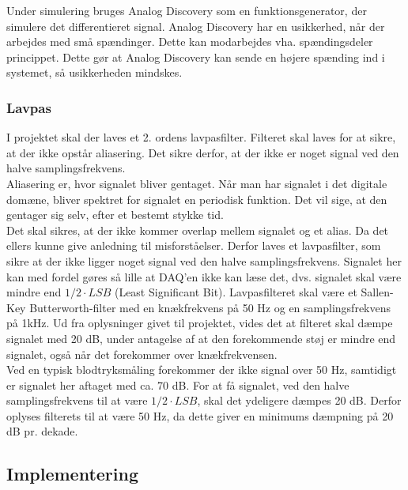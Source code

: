 Under simulering bruges Analog Discovery som en funktionsgenerator, der simulere det differentieret signal. Analog Discovery har en usikkerhed, når der arbejdes med små spændinger. Dette kan modarbejdes vha. spændingsdeler princippet. Dette gør at Analog Discovery kan sende en højere spænding ind i systemet, så usikkerheden mindskes.  

\subsubsection{Lavpas}
I projektet skal der laves et 2. ordens lavpasfilter. Filteret skal laves for at sikre, at der ikke opstår aliasering. Det sikre derfor, at der ikke er noget signal ved den halve samplingsfrekvens.\\
Aliasering \cite{DSB} er, hvor signalet bliver gentaget. Når man har signalet i det digitale domæne, bliver spektret for signalet en periodisk funktion. Det vil sige, at den gentager sig selv, efter et bestemt stykke tid. \\
Det skal sikres, at der ikke kommer overlap mellem signalet og et alias. Da det ellers kunne give anledning til misforståelser. Derfor laves et lavpasfilter, som sikre at der ikke ligger noget signal ved den halve samplingsfrekvens. Signalet her kan med fordel gøres så lille at DAQ'en ikke kan læse det, dvs. signalet skal være mindre end $ 1/2 \cdot LSB $ (Least Significant Bit).    
\newline  
Lavpasfilteret skal være et Sallen-Key Butterworth-filter med en knækfrekvens på 50 Hz og en samplingsfrekvens på 1kHz. Ud fra oplysninger givet til projektet, vides det at filteret skal dæmpe signalet med 20 dB, under antagelse af at den forekommende støj er mindre end signalet, også når det  forekommer over knækfrekvensen.\\
Ved en typisk blodtryksmåling forekommer der ikke signal over 50 Hz, samtidigt er signalet her aftaget med ca. 70 dB. For at få signalet, ved den halve samplingsfrekvens til at være $ 1/2 \cdot LSB $, skal det ydeligere dæmpes 20 dB. Derfor oplyses filterets til at være 50 Hz, da dette giver en minimums dæmpning på 20 dB pr. dekade.

\subsection{Implementering}
